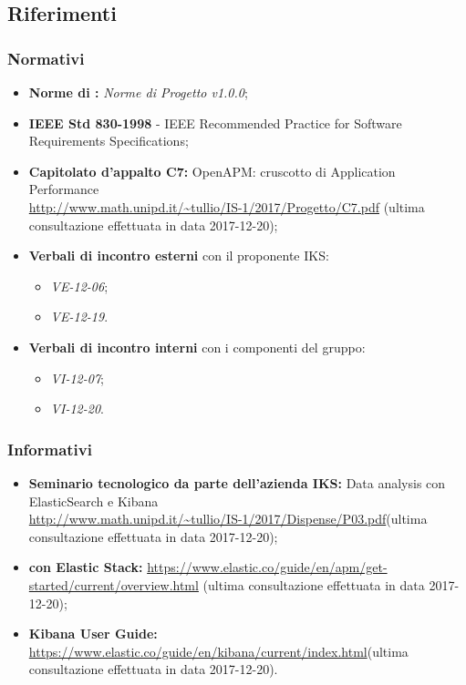 	\subsection{Riferimenti}
	\subsubsection{Normativi}
	\begin{itemize}
		\item \textbf{Norme di :} \emph{Norme di Progetto v1.0.0};
		\item \textbf{IEEE Std 830-1998} - IEEE Recommended Practice for Software Requirements Specifications;
		\item \textbf{Capitolato d'appalto C7:} OpenAPM: cruscotto di Application Performance  \\ \url{http://www.math.unipd.it/~tullio/IS-1/2017/Progetto/C7.pdf} (ultima consultazione effettuata in data 2017-12-20);
		\item \textbf{Verbali di incontro esterni} con il proponente IKS: \begin{itemize}
			\item \emph{VE-12-06};
			\item \emph{VE-12-19}.
		\end{itemize}
		\item \textbf{Verbali di incontro interni} con i componenti del gruppo:
		\begin{itemize}
			\item \emph{VI-12-07};
			\item \emph{VI-12-20}.
		\end{itemize}
	\end{itemize}
	
	\subsubsection{Informativi}
	\begin{itemize}
		\item \textbf{Seminario tecnologico da parte dell'azienda IKS:} Data analysis con ElasticSearch e Kibana \\ \url{http://www.math.unipd.it/~tullio/IS-1/2017/Dispense/P03.pdf}(ultima consultazione effettuata in data 2017-12-20);
		\item \textbf{ con Elastic Stack:} \url{https://www.elastic.co/guide/en/apm/get-started/current/overview.html} (ultima consultazione effettuata in data 2017-12-20);
		\item \textbf{Kibana User Guide:} \url{https://www.elastic.co/guide/en/kibana/current/index.html}(ultima consultazione effettuata in data 2017-12-20).
	
	\end{itemize}
	